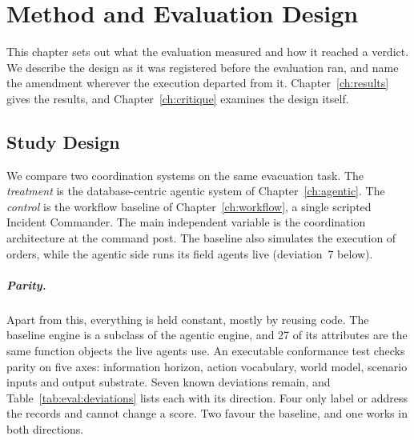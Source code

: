 \chapter{Method and Evaluation Design}
\label{ch:eval}

%

This chapter sets out what the evaluation measured and how it reached a
verdict. We describe the
design as it was registered before the evaluation ran, and name the amendment
wherever the execution departed from it. Chapter~\ref{ch:results} gives the
results, and Chapter~\ref{ch:critique} examines the design itself.

\section{Study Design}
\label{sec:eval:overview}

We compare two coordination systems on the same evacuation task. The
\emph{treatment} is the database-centric agentic system of
Chapter~\ref{ch:agentic}. The \emph{control} is the workflow baseline of
Chapter~\ref{ch:workflow}, a single scripted Incident Commander. The main
independent variable is the coordination architecture at the command post. The
baseline also simulates the execution of orders, while the agentic side runs
its field agents live (deviation~7 below).

\paragraph{Parity.} Apart from this, everything is held constant, mostly by
reusing code.
The baseline engine is a subclass of the agentic engine, and 27 of its
attributes are the same function objects the live agents use. An executable
conformance test checks parity on five axes: information horizon, action
vocabulary, world model, scenario inputs and output substrate. Seven known
deviations remain, and Table~\ref{tab:eval:deviations} lists each with its
direction. Four only label or address the records and cannot change a
score. Two favour the baseline, and one works in both directions.

